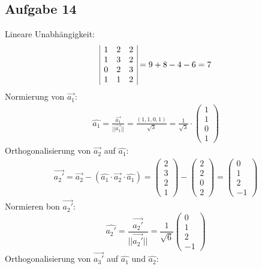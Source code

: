 \documentclass{article}
\begin{document}
\subsection*{Aufgabe 14}
Lineare Unabhängigkeit:
\begin{equation*}
    \begin{array}{| c c c |}
        1&2&2\\
        1&3&2\\
        0&2&3\\
        1&1&2
    \end{array} = 9+8-4-6 = 7
\end{equation*}
Normierung von $\vec{a_1}$:
\begin{eqnarray*}
    \hat{a_1} = \frac{\vec{a_1}}{||\vec{a_1}||} = \frac{(1,1,0,1)}{\sqrt{3}} = \frac{1}{\sqrt{3}}\cdot \left(\begin{array}{c}1\\1\\0\\1\end{array}\right)
\end{eqnarray*}
Orthogonalisierung von $\vec{a_2}$ auf $\hat{a_1}$:
\begin{eqnarray*}
    \vec{a_2'} = \vec{a_2} - (\hat{a_1}\cdot\vec{a_2}\cdot\hat{a_1}) = \left(\begin{array}{c}2\\3\\2\\1\end{array}\right)-\left(\begin{array}{c}2\\2\\0\\2\end{array}\right) = \left(\begin{array}{c}0\\1\\2\\-1\end{array}\right)
\end{eqnarray*}
Normieren bon $\vec{a_2'}$:
\begin{equation*}
    \hat{a_2'}=\frac{\vec{a_2'}}{||\vec{a_2'}||} = \frac{1}{\sqrt{6}} \left(\begin{array}{c}0\\1\\2\\-1\end{array}\right)
\end{equation*}
Orthogonalisierung von $\vec{a_3'}$ auf $\hat{a_1}$ und $\hat{a_2}$:
\end{document}
